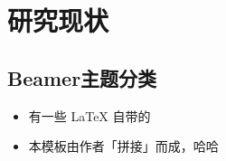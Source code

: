 
\section{研究现状}

\subsection{Beamer主题分类}

\begin{frame}
    \begin{itemize}
        \item 有一些 \LaTeX{} 自带的
        \item 本模板由作者「拼接」而成，哈哈
    \end{itemize}
\end{frame}

